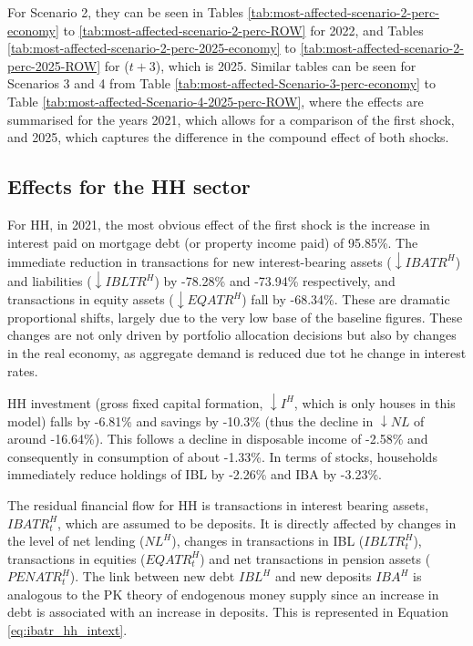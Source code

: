 \documentclass[
]{book}
\begin{document}
For Scenario 2, they can be seen in Tables \ref{tab:most-affected-scenario-2-perc-economy} to \ref{tab:most-affected-scenario-2-perc-ROW} for 2022, and Tables \ref{tab:most-affected-scenario-2-perc-2025-economy} to \ref{tab:most-affected-scenario-2-perc-2025-ROW} for (\(t+3\)), which is 2025. Similar tables can be seen for Scenarios 3 and 4 from Table \ref{tab:most-affected-Scenario-3-perc-economy} to Table \ref{tab:most-affected-Scenario-4-2025-perc-ROW}, where the effects are summarised for the years 2021, which allows for a comparison of the first shock, and 2025, which captures the difference in the compound effect of both shocks.

\hypertarget{effects-for-the-hh-sector}{%
\subsection{Effects for the HH sector}\label{effects-for-the-hh-sector}}

For HH, in 2021, the most obvious effect of the first shock is the increase in interest paid on mortgage debt (or property income paid) of 95.85\%. The immediate reduction in transactions for new interest-bearing assets (\(\downarrow IBATR^H\)) and liabilities (\(\downarrow IBLTR^H\)) by -78.28\% and -73.94\% respectively, and transactions in equity assets (\(\downarrow EQATR^H\)) fall by -68.34\%. These are dramatic proportional shifts, largely due to the very low base of the baseline figures. These changes are not only driven by portfolio allocation decisions but also by changes in the real economy, as aggregate demand is reduced due tot he change in interest rates.

HH investment (gross fixed capital formation, \(\downarrow I^H\), which is only houses in this model) falls by -6.81\% and savings by -10.3\% (thus the decline in \(\downarrow NL\) of around -16.64\%). This follows a decline in disposable income of -2.58\% and consequently in consumption of about -1.33\%. In terms of stocks, households immediately reduce holdings of IBL by -2.26\% and IBA by -3.23\%.

The residual financial flow for HH is transactions in interest bearing assets, \(IBATR^H_t\), which are assumed to be deposits. It is directly affected by changes in the level of net lending (\(NL^H\)), changes in transactions in IBL (\(IBLTR^H_t\)), transactions in equities (\(EQATR^H_t\)) and net transactions in pension assets (\(PENATR^H_t\)). The link between new debt \(IBL^H\) and new deposits \(IBA^H\) is analogous to the PK theory of endogenous money supply since an increase in debt is associated with an increase in deposits. This is represented in Equation \ref{eq:ibatr_hh_intext}.
\end{document}
